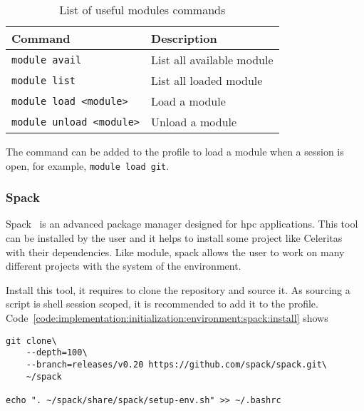 \begin{table}[ht]
    \centering
    \begin{tabular}{|l|l|}
        \hline
        \textbf{Command} & \textbf{Description} \\
        \hline
        \texttt{module avail} & List all available module \\
        \hline
        \texttt{module list} & List all loaded module \\
        \hline
        \texttt{module load <module>} & Load a module \\
        \hline
        \texttt{module unload <module>} & Unload a module \\
        \hline
    \end{tabular}
    \caption{List of useful modules commands}
    \label{tab:implementation:initialization:environment:module:commands}
\end{table}

The command can be added to the profile to load a module when a session is open,
for example, \texttt{module load git}.


\subsubsection{Spack}
\label{ch:implementation:initialization:environment:spack}

Spack~\cite{Spack} is an advanced package manager designed for \acrshort{hpc} applications.
This tool can be installed by the user and it helps to install some project like
Celeritas with their dependencies.
Like module, spack allows the user to work on many different projects with the
system of the environment.

Install this tool, it requires to clone the repository and source it.
As sourcing a script is shell session scoped, it is recommended to add it to the
profile.
Code~\ref{code:implementation:initialization:environment:spack:install} shows

\begin{code}
    \label{code:implementation:initialization:environment:spack:install}
    \begin{verbatim}
git clone\
    --depth=100\
    --branch=releases/v0.20 https://github.com/spack/spack.git\
    ~/spack

echo ". ~/spack/share/spack/setup-env.sh" >> ~/.bashrc
    \end{verbatim}
\end{code}

